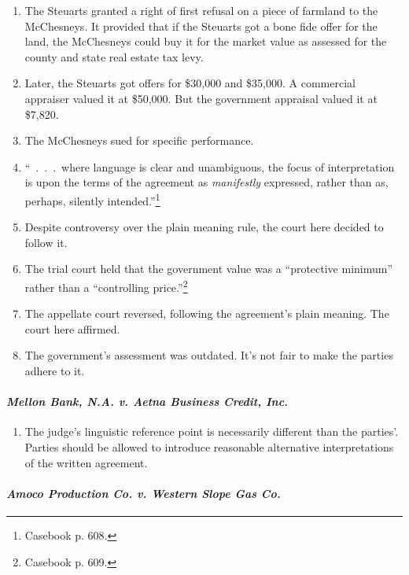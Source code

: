\begin{enumerate}
    \item The Steuarts granted a right of first refusal on a piece of farmland 
    to the McChesneys. It provided that if the Steuarts got a bone fide offer 
    for the land, the McChesneys could buy it for the market value as assessed 
    for the county and state real estate tax levy.
    \item Later, the Steuarts got offers for \$30,000 and \$35,000. A 
    commercial appraiser valued it at \$50,000. But the government appraisal 
    valued it at \$7,820.
    \item The McChesneys sued for specific performance.
    \item ``~.~.~.~where language is clear and unambiguous, the focus of 
    interpretation is upon the terms of the agreement as \emph{manifestly} 
    expressed, rather than as, perhaps, silently intended.''\footnote{Casebook 
    p. 608.}
    \item Despite controversy over the plain meaning rule, the court here 
    decided to follow it.
    \item The trial court held that the government value was a ``protective 
    minimum'' rather than a ``controlling price.''\footnote{Casebook p. 609.}
    \item The appellate court reversed, following the agreement's plain 
    meaning. The court here affirmed.
    \item The government's assessment was outdated. It's not fair to make the 
    parties adhere to it.
\end{enumerate}

\paragraph{\emph{Mellon Bank, N.A. v. Aetna Business Credit, Inc.}}

\begin{enumerate}
    \item The judge's linguistic reference point is necessarily different 
    than the parties'. Parties should be allowed to introduce reasonable 
    alternative interpretations of the written agreement.
\end{enumerate}

\paragraph{\emph{Amoco Production Co. v. Western Slope Gas Co.}}

